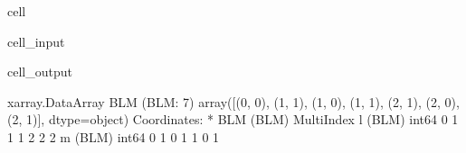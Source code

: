 \documentclass[letterpaper,table,10pt,english]{jupyterBook}
\begin{document}
\begin{sphinxuseclass}{cell}\begin{sphinxVerbatimInput}

\begin{sphinxuseclass}{cell_input}
\begin{sphinxVerbatim}[commandchars=\\\{\}]


\end{sphinxVerbatim}

\end{sphinxuseclass}\end{sphinxVerbatimInput}
\begin{sphinxVerbatimOutput}

\begin{sphinxuseclass}{cell_output}
\begin{sphinxVerbatim}[commandchars=\\\{\}]
\PYGZlt{}xarray.DataArray \PYGZsq{}BLM\PYGZsq{} (BLM: 7)\PYGZgt{}
array([(0, 0), (1, \PYGZhy{}1), (1, 0), (1, 1), (2, \PYGZhy{}1), (2, 0), (2, 1)], dtype=object)
Coordinates:
  * BLM      (BLM) MultiIndex
  \PYGZhy{} l        (BLM) int64 0 1 1 1 2 2 2
  \PYGZhy{} m        (BLM) int64 0 \PYGZhy{}1 0 1 \PYGZhy{}1 0 1
\end{sphinxVerbatim}

\end{sphinxuseclass}\end{sphinxVerbatimOutput}

\end{sphinxuseclass}
\end{document}
